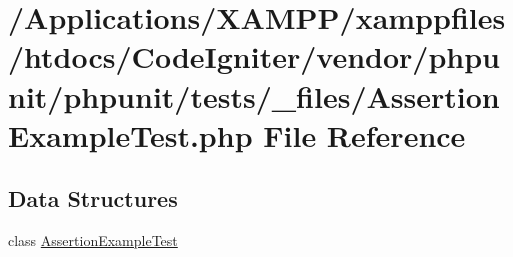 \hypertarget{_assertion_example_test_8php}{}\section{/\+Applications/\+X\+A\+M\+P\+P/xamppfiles/htdocs/\+Code\+Igniter/vendor/phpunit/phpunit/tests/\+\_\+files/\+Assertion\+Example\+Test.php File Reference}
\label{_assertion_example_test_8php}
\subsection*{Data Structures}
\begin{DoxyCompactItemize}
\item 
class \mbox{\hyperlink{class_assertion_example_test}{Assertion\+Example\+Test}}
\end{DoxyCompactItemize}
